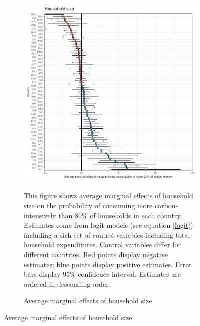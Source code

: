  \begin{figure}[ht!]\ContinuedFloat
   \centering
   \begin{subfigure}[b]{\textwidth}
   \centering
   \caption{Average marginal effects of household size} \label{fig:Logit_ME_size}
   \includegraphics{1_Figures/Analysis_Logit_Models_Marginal_Effects/Average_Marginal_Effects_affected_upper_80_hh_size_2017B.pdf}
   \begin{subcaption2}
     This figure shows average marginal effects of household size on the probability of consuming more carbon-intensively than 80\% of households in each country. Estimates come from logit-models (see equation \ref{logit}) including a rich set of control variables including total household expenditures. Control variables differ for different countries. Red points display negative estimates; blue points display positive estimates. Error bars display 95\%-confidence interval. Estimates are ordered in descending order.
   \end{subcaption2}
   \end{subfigure}
 \end{figure}
 \clearpage

